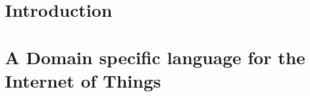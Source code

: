 \documentclass{hessothesis}
\begin{document}
\maketitle

\makeinfopage

\part{Introduction}
\label{part:introduction}



\part{A Domain specific language for the Internet of Things}
\label{part:dsl}







\printbibliography

\printglossaries

\end{document}
